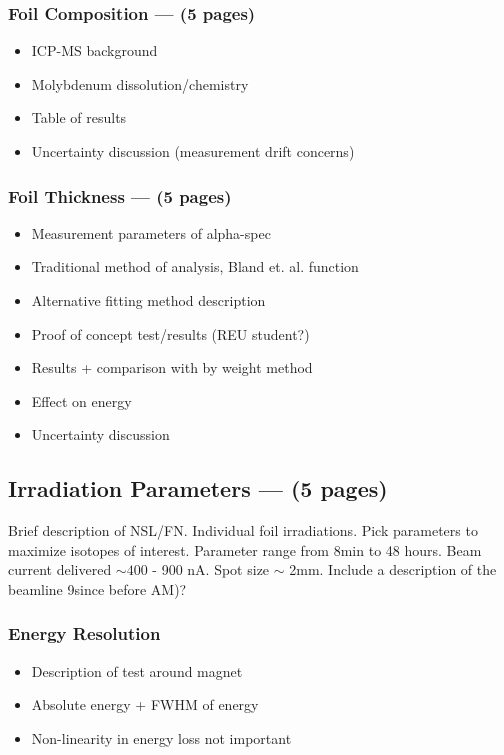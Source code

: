 \documentclass[final,3p,times,twocolumn,authoryear]{elsarticle_modified}
\begin{document}
	\subsubsection{Foil Composition --- (5 pages)}
	\begin{itemize}
	\itemsep-0.2em 
	  \item ICP-MS background
	  \item Molybdenum dissolution/chemistry
	  \item Table of results
	  \item Uncertainty discussion (measurement drift concerns)
	\end{itemize}

	\subsubsection{Foil Thickness --- (5 pages)}
	\begin{itemize}
	\itemsep-0.2em 
	  \item Measurement parameters of alpha-spec
	  \item Traditional method of analysis, Bland et. al. function
	  \item Alternative fitting method description
	  \item Proof of concept test/results (REU student?)
	  \item Results + comparison with by weight method
	  \item Effect on energy
	  \item Uncertainty discussion
	\end{itemize}

\subsection{Irradiation Parameters --- (5 pages)}
\label{FN}
	Brief description of NSL/FN. Individual foil irradiations. Pick parameters to maximize isotopes of interest. Parameter range from 8min to 48 hours. Beam current delivered $\sim400$ - 900 nA. Spot size $\sim$ 2mm. Include a description of the beamline 9since before AM)? 
	\subsubsection{Energy Resolution}
	\begin{itemize}
	\itemsep-0.5em 
	  \item Description of test around magnet
	  \item Absolute energy + FWHM of energy
	  \item Non-linearity in energy loss not important
	\end{itemize}
\end{document}
